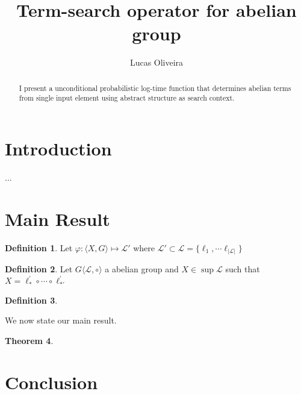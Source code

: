 \documentclass[11pt]{amsart}
\newcommand{\truncateit}[1]{\truncate{0.8\textwidth}{#1}}
\newcommand{\scititle}[1]{\title[\truncateit{#1}]{#1}}
\theoremstyle{plain}
\newtheorem{theorem}{Theorem}[section]
\theoremstyle{definition}
\newtheorem{definition}[theorem]{Definition}
\begin{document}
\begin{abstract}
I present a unconditional probabilistic log-time function that determines abelian terms from single input element using abstract structure as search context.
\end{abstract}


\scititle{Term-search operator for abelian group}
\author{Lucas Oliveira}
\date{}
\maketitle











\section{Introduction}


...


\section{Main Result}


\begin{definition}
 Let $\varphi : \langle X, G \rangle \mapsto \mathcal L'$ where $\mathcal L' \subset \mathcal L = \{\ell_1,\cdots \ell_{|\mathcal L|}\}$
\end{definition}



\begin{definition}
	Let $G\langle \mathcal L , \circ \rangle $ a abelian group and $X \in \sup \mathcal L $ such that $X = \ell^{'}_* \circ \cdots \circ \ell^{'}_{*'}$
\end{definition}



\begin{definition}

\end{definition}


We now state our main result.

\begin{theorem}

\end{theorem}



\section{Conclusion}
\end{document}
